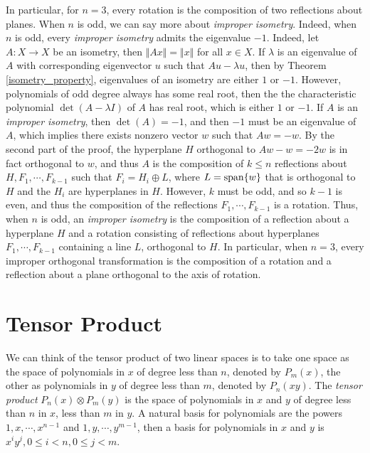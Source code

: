 \documentclass[11pt]{book}
\theoremstyle{definition}
\numberwithin{equation}{chapter}
\begin{document}
\begin{subappendices}
In particular, for $n = 3$, every rotation is the composition of two reflections about planes. When $n$ is odd, we can say more about {\em improper isometry}. Indeed, when $n$ is odd, every {\em improper isometry} admits the eigenvalue $-1$. Indeed, let $A: X \to X$ be an isometry, then $\Vert Ax \Vert = \Vert x \Vert$ for all $x \in X$. If $\lambda$ is an eigenvalue of $A$ with corresponding eigenvector $u$ such that $Au - \lambda u$, then by Theorem \ref{isometry_property}, eigenvalues of an isometry are either $1$ or $-1$. However, polynomials of odd degree always has some real root, then the the characteristic polynomial $\det (A - \lambda I)$ of $A$ has real root, which is either $1$ or $-1$. If $A$ is an {\em improper isometry}, then $\det (A) = -1$, and then $-1$ must be an eigenvalue of $A$, which implies there exists nonzero vector $w$ such that $Aw = - w$. By the second part of the proof, the hyperplane $H$ orthogonal to $Aw - w = -2w$ is in fact orthogonal to $w$, and thus $A$ is the composition of $k \leq n$ reflections about $H, F_1, \cdots, F_{k-1}$ such that $F_i = H_i \oplus L$, where $L = {\rm span}\{w\}$ that is orthogonal to $H$ and the $H_i$ are hyperplanes in $H$. However, $k$ must be odd, and so $k - 1$ is even, and thus the composition of the reflections $F_1, \cdots, F_{k-1}$ is a rotation.  Thus, when $n$ is odd, an {\em improper isometry} is the composition of a reflection about a hyperplane $H$ and a rotation consisting of reflections about hyperplanes $F_1, \cdots, F_{k-1}$ containing a line $L$, orthogonal to $H$. In particular, when $n = 3$, every improper orthogonal transformation is the composition of a rotation and a reflection about a plane orthogonal to the axis of rotation{\bf \cite{35}}.

\medskip

\section{Tensor Product}

We can think of the tensor product of two linear spaces is to take one space as the space of polynomials in $x$ of degree less than $n$, denoted by $P_m(x)$, the other as polynomials in $y$ of degree less than $m$, denoted by $P_n(xy)$. The {\em tensor product} $P_n(x) \otimes P_m(y)$ is the space of polynomials in $x$ and $y$ of degree less than $n$ in $x$, less than $m$ in $y$. A natural basis for polynomials are the powers $1, x, \cdots, x^{n-1}$ and $1, y, \cdots, y^{m-1}$, then a basis for polynomials in $x$ and $y$ is $x^iy^j, 0 \leq i < n, 0 \leq j < m$.


\end{subappendices}
\end{document}
